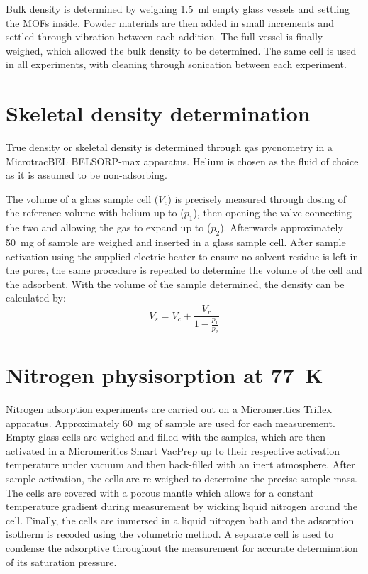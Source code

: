 Bulk density is determined by weighing \SI{1.5}{\milli\litre} empty 
glass vessels and settling the MOFs inside. Powder materials are then added
in small increments and settled through vibration between each
addition. The full vessel is finally weighed, which allowed the bulk
density to be determined. The same cell is used in all experiments,
with cleaning through sonication between each experiment.

\section{Skeletal density determination}\label{appx:char:truedensity}

True density or skeletal density is determined through gas pycnometry
in a MicrotracBEL BELSORP-max apparatus. Helium is chosen
as the fluid of choice as it is assumed to be non-adsorbing.

The volume of a glass sample cell (\(V_c\)) is precisely measured through
dosing of the reference volume with helium up to (\(p_1\)), then opening the valve 
connecting the two and allowing the gas to expand up to (\(p_2\)). 
Afterwards approximately \SI{50}{\milli\gram} of sample are weighed
and inserted in a glass sample cell. After sample activation using the
supplied electric heater to ensure no solvent residue is left in the pores,
the same procedure is repeated to determine the volume of the cell
and the adsorbent. With the volume of the sample determined, the
density can be calculated by:
%
\begin{equation}
%
    V_s = V_c + \frac{V_r}{1- \frac{p_1}{p_2}}
%
\end{equation}


\section{Nitrogen physisorption at \SI{77}{\kelvin}}\label{appx:char:N2phys}

Nitrogen adsorption experiments are carried out on a 
Micromeritics Triflex apparatus. Approximately \SI{60}{\milli\gram}
of sample are used for each measurement.
Empty glass cells are weighed and filled with the samples, which 
are then activated in a Micromeritics Smart VacPrep up to 
their respective activation
temperature under vacuum and then back-filled with an inert
atmosphere. After sample activation, the cells are re-weighed
to determine the precise sample mass. The cells are covered with
a porous mantle which allows for a constant temperature gradient
during measurement by wicking liquid nitrogen around the
cell. Finally, the cells are immersed in a liquid nitrogen bath
and the adsorption isotherm is recoded using the volumetric
method. A separate cell is used to condense the adsorptive 
throughout the measurement for accurate determination of
its saturation pressure.

